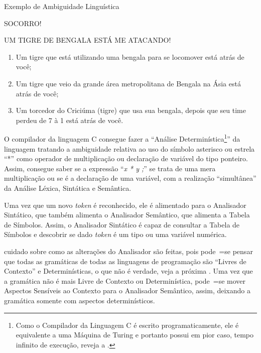 \begin{quadro}[!htb]
\caption{Exemplo de Ambiguidade Linguística}
\label{exemploDeAmbiguidadeLinguistica}
\begin{bluebox}
    SOCORRO!

    UM TIGRE DE BENGALA ESTÁ ME ATACANDO!

    \begin{enumerate}%
        \item Um tigre que está utilizando uma bengala para se locomover está atrás de você;
        \item Um tigre que veio da grande área metropolitana de Bengala na Ásia está atrás de você;
        \item Um torcedor do Criciúma (tigre) que usa sua bengala,
        depois que seu time perdeu de 7 à 1 está atrás de você.
    \end{enumerate}
\end{bluebox}
\end{quadro}

O compilador da linguagem C consegue fazer a ``Análise Determinística\footnote{
Como o Compilador da Linguagem C é escrito programaticamente,
ele é equivalente a uma Máquina de Turing e
portanto possui em pior caso,
tempo infinito de execução,
reveja a .
}'' da linguagem tratando a ambiguidade relativa ao uso do símbolo asterisco ou
estrela ``*'' como operador de multiplicação ou
declaração de variável do tipo ponteiro.
Assim,
consegue saber se a expressão ``\textit{x * y ;}'' se trata de uma mera multiplicação ou
se é a declaração de uma variável,
com a realização ``simultânea'' da Análise Léxica,
Sintática e
Semântica.

Uma vez que um novo \textit{token} é reconhecido,
ele é alimentado para o Analisador Sintático,
que também alimenta o Analisador Semântico,
que alimenta a Tabela de Símbolos.
Assim,
o Analisador Sintático é capaz de consultar a Tabela de Símbolos \cite{ahoCompilerDragonBook} e
descobrir se dado \textit{token} é um tipo ou
uma variável numérica.

 cuidado sobre como as alterações do Analisador são feitas,
pois pode~=se pensar que todas as gramáticas de todas as linguagens de programação são ``Livres de Contexto'' e
Determinísticas,
o que não é verdade,
veja a próxima .
Uma vez que a gramática não é mais Livre de Contexto ou
Determinística,
pode~=se mover Aspectos Sensíveis ao Contexto para o Analisador Semântico,
assim,
deixando a gramática somente com aspectos determinísticos.


